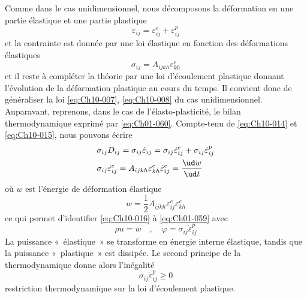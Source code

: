 Comme dans le cas unidimensionnel, nous décomposons la déformation 
en une partie élastique et une partie plastique 
\begin{equation}
    \varepsilon_{ij} = \varepsilon_{ij}^e + \varepsilon_{ij}^p
    \label{eq:Ch10-014}
\end{equation}
et la contrainte est donnée par une loi élastique en fonction des déformations élastiques 
\begin{equation}
    \sigma_{ij} = A_{ijkh} \varepsilon_{kh}^e
    \label{eq:Ch10-015}
\end{equation}
et il reste à compléter la théorie par une loi d'écoulement plastique donnant l'évolution de la déformation plastique au cours du temps.
Il convient donc de généraliser la loi \eqref{eq:Ch10-007}, \eqref{eq:Ch10-008} du cas unidimensionnel.
Auparavant, reprenons, dans le cas de l'élasto-plasticité, le bilan thermodynamique exprimé par \eqref{eq:Ch01-060}.
Compte-tenu de \eqref{eq:Ch10-014} et \eqref{eq:Ch10-015}, nous pouvons écrire 
\begin{equation}
    \begin{aligned}
        & \sigma_{ij} D_{ij} = \sigma_{ij} \dot{\varepsilon}_{ij} = \sigma_{ij} \dot{\varepsilon}_{ij}^e + \sigma_{ij} \dot{\varepsilon}_{ij}^p \\
        & \sigma_{ij} \dot{\varepsilon}_{ij}^e = A_{ijkh} \varepsilon_{kh}^e \dot{\varepsilon}_{ij}^e = \frac{\ud w}{\ud t}
    \end{aligned}
    \label{eq:Ch10-016}
\end{equation}
où $w$ est l'énergie de déformation élastique
\begin{equation}
    w = \frac{1}{2} A_{ijkh} \varepsilon_{ij}^e \varepsilon_{kh}^e
    \label{eq:Ch10-017}
\end{equation}
ce qui permet d'identifier \eqref{eq:Ch10-016} à \eqref{eq:Ch01-059} avec 
\begin{equation}
    \rho u = w \quad,\quad \varphi = \sigma_{ij} \dot{\varepsilon}_{ij}^p
    \label{eq:Ch10-018}
\end{equation}
La puissance «~élastique~» se transforme en énergie interne élastique, tandis que la puissance «~plastique~» est dissipée.
Le second principe de la thermodynamique donne alors l'inégalité 
\begin{equation}
    \sigma_{ij} \dot{\varepsilon}_{ij}^p \geq 0
    \label{eq:Ch10-018}
\end{equation}
restriction thermodynamique sur la loi d'écoulement plastique. 

